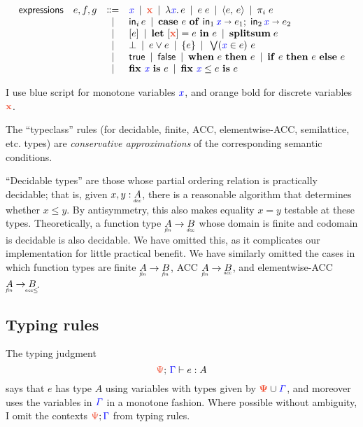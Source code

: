 \documentclass{article}
\begin{document}
\[\begin{array}{rccl}
  \textsf{expressions} & e,f,g
  &\bnfeq& \m{x} \pipe \d{x} \pipe \fn\bind{\m{x}} e \pipe e\; e
  \pipe \pair{e}{e} \pipe \pi_i\; e\\
  &&\pipe& \inj{i}{e} \pipe \case{e}{\m{x}}{e_1}{\m{x}}{e_2}\\
  &&\pipe& \disc{e} \pipe \letdisc{\d{x}}{e}{e} \pipe \splitsum{e}\\
  &&\pipe& \unit \pipe e \vee e \pipe \single{e} \pipe \setelim{\m{x}}{e}{e}\\
  &&\pipe& \etrue \pipe \efalse \pipe \when{e}{e} \pipe \ifthen{e}{e}{e}\\
  &&\pipe& \fix{\m{x}}{e} \pipe \fixle{\m{x}}{e}{e}
\end{array}
\]

I use blue script for monotone variables ${\color{blue}{\mathit{x}}}$, and orange bold for discrete variables $\d{x}$.

The ``typeclass'' rules (for decidable, finite, ACC, elementwise-ACC, semilattice, etc.\! types) are \emph{conservative approximations} of the corresponding semantic conditions.

``Decidable types'' are those whose partial ordering relation is practically decidable; that is, given $x, y : \eq{A}$, there is a reasonable algorithm that determines whether $x \le y$.
By antisymmetry, this also makes equality $x = y$ testable at these types. Theoretically, a function type $\under{fin}{A} \to \eq{B}$ whose domain is finite and codomain is decidable is also decidable.
We have omitted this, as it complicates our implementation for little practical
benefit.
We have similarly omitted the cases in which function types are finite $\fin{A} \to \fin{B}$, ACC $\fin{A} \to \acc{B}$, and elementwise-ACC $\fin{A} \to \eltacc{B}$.


\subsection{Typing rules}

The typing judgment \[\J{\GP}{\GG}{e}{A}\] says that $e$ has type $A$ using variables with types given by $\d{\GP} \cup \m{\GG}$, and moreover uses the variables in ${\color{blue}{\mathit{\Gamma}}}$ in a monotone fashion.
Where possible without ambiguity, I omit the contexts $\dt{\GP};\mt{\GG}$ from typing rules.
\end{document}
